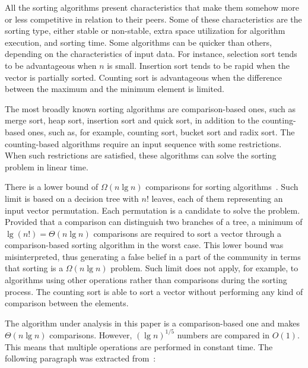 \documentclass[11pt]{article}
\begin{document}
 All the sorting algorithms present characteristics that make them somehow more or less competitive in relation to their peers. Some of these characteristics are the sorting type, either stable or non-stable, extra space utilization for algorithm execution, and sorting time. Some algorithms can be quicker than others, depending on the characteristics of input data. For instance, selection sort tends to be advantageous when $n$ is small. Insertion sort tends to be rapid when the vector is partially sorted. Counting sort is advantageous when the difference between the maximum and the minimum element is limited. 
 



The most broadly known sorting algorithms are comparison-based ones, such as merge sort, heap sort, insertion sort and quick sort, in addition to the counting-based ones, such as, for example, counting sort, bucket sort and radix sort. The counting-based algorithms require an input sequence with some restrictions. When such restrictions are satisfied, these algorithms can solve the sorting problem in linear time.




There is a lower bound of $\Omega(n\lg n) $ comparisons for sorting algorithms~\cite{knuth}. Such limit is based on a decision tree with $n!$ leaves, each of them representing an input vector permutation. Each permutation is a candidate to solve the problem. Provided that a comparison can distinguish two branches of a tree, a minimum of $\lg(n!) = \Theta(n\lg n) $ comparisons are required to sort a vector through a comparison-based sorting algorithm in the worst case. This lower bound was misinterpreted, thus generating a false belief in a part of the community in terms that sorting is a  $\Omega(n\lg n)$ problem. Such limit does not apply, for example, to algorithms using other operations rather than comparisons during the sorting process. The counting sort is able to sort a vector without performing any kind of comparison between the elements.




The algorithm under analysis in this paper is a comparison-based one and makes $\Theta(n \lg n)$  comparisons. However, $(\lg n)^{1/5}$ numbers are compared in $O(1)$. This means that multiple operations are performed in constant time. The following paragraph was extracted from~\cite{cormen}:
\end{document}
